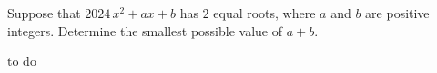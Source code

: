 Suppose that $2024\,x^{2}+ax+b$ has $2$ equal roots, where $a$ and $b$ are positive integers. Determine the smallest possible value of $a+b$. 
\begin{answer}
to do
\end{answer}
